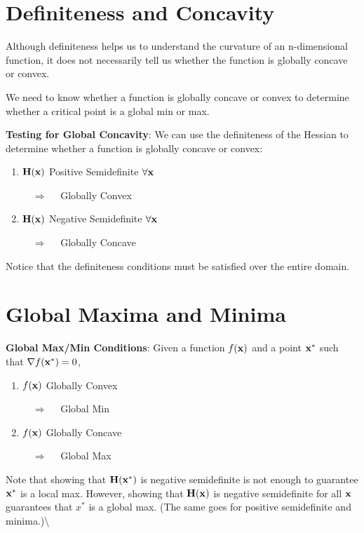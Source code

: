 \documentclass[]{book}
\newcommand{\fx}{f({\bf x})}
\theoremstyle{definition}
\theoremstyle{definition}
\theoremstyle{definition}
\theoremstyle{remark}
\begin{document}
\section{Definiteness and Concavity}\label{definiteness-and-concavity}

Although definiteness helps us to understand the curvature of an
n-dimensional function, it does not necessarily tell us whether the
function is globally concave or convex.

We need to know whether a function is globally concave or convex to
determine whether a critical point is a global min or max.

\textbf{Testing for Global Concavity}: We can use the definiteness of
the Hessian to determine whether a function is globally concave or
convex:

\begin{enumerate}
        \item \parbox[t]{2.3in}{$\bf H(x)$ Positive Semidefinite 
        $\forall {\bf x}$} $\quad \Longrightarrow \quad$ Globally Convex
         \item \parbox[t]{2.3in}{$\bf H(x)$ Negative Semidefinite 
         $\forall {\bf x}$} $\quad \Longrightarrow \quad$ Globally 
         Concave
\end{enumerate}

Notice that the definiteness conditions must be satisfied over the
entire domain.

\section{Global Maxima and Minima}\label{global-maxima-and-minima}

\textbf{Global Max/Min Conditions}: Given a function \(\fx\) and a point
\({\bf x}^*\) such that \(\nabla f({\bf x}^*)=0\),

\begin{enumerate}
  \item \parbox[t]{2in}{$\fx$ Globally Convex} $\quad
\Longrightarrow \quad$ Global Min
  \item \parbox[t]{2in}{$\fx$ Globally Concave} $\quad
\Longrightarrow \quad$ Global Max
\end{enumerate}

Note that showing that \(\bf H(x^*)\) is negative semidefinite is not
enough to guarantee \({\bf x}^*\) is a local max. However, showing that
\(\bf H(x)\) is negative semidefinite for all \({\bf x}\) guarantees
that \(x^*\) is a global max. (The same goes for positive semidefinite
and minima.)\textbackslash{}
\end{document}
